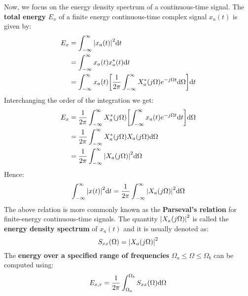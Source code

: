\documentclass[../../main/main.tex]{subfiles}
\begin{document}
\medskip
{}
Now, we focus on the energy density spectrum of a continuous-time signal. The \textbf{total energy} \( E_{x} \) of a finite energy continuous-time complex signal \( x_{a}(t) \) is given by:
\begin{align}
    E_{x}
    &=
        \int_{-\infty}^{\infty} \abs{x_{a}(t)}^2 \mathrm{d}{t}  \nonumber   \\
    &=
        \int_{-\infty}^{\infty} x_{a}(t) x^*_{a}(t) \mathrm{d}{t}   \nonumber   \\
    &=
        \int_{-\infty}^{\infty} x_{a}(t) \qty[\frac{1}{2\pi} \int_{-\infty}^{\infty} X_{a}^{*}(j\Omega) e^{-j\Omega t} \mathrm{d}{\Omega}] \mathrm{d}{t}
\end{align}
Interchanging the order of the integration we get:
\begin{align}
    E_{x}
    &=
        \frac{1}{2\pi} \int_{-\infty}^{\infty} X_{a}^{*}(j\Omega) \qty[\int_{-\infty}^{\infty} x_{a}(t) e^{-j\Omega t} \mathrm{d}{t}] \mathrm{d}{\Omega}    \nonumber   \\
    &=
        \frac{1}{2\pi} \int_{-\infty}^{\infty} X_{a}^{*}(j\Omega) X_{a}(j\Omega) \mathrm{d}{\Omega} \nonumber   \\
    &=
        \frac{1}{2\pi} \int_{-\infty}^{\infty} \abs{X_{a}(j\Omega)}^2 \mathrm{d}{\Omega}
\end{align}
Hence:
\begin{equation}
    \int_{-\infty}^{\infty} \abs{x(t)}^2 \mathrm{d}{t}
    =
    \frac{1}{2\pi} \int_{-\infty}^{\infty} \abs{X_{a}(j\Omega)}^2 \mathrm{d}{\Omega}
    \label{eq:L08_S11_1}
\end{equation}
The above relation is more commonly known as the \textbf{Parseval's relation} for finite-energy continuous-time signals.
The quantity \( \abs{X_{a}(j\Omega)}^2 \) is called the \textbf{energy density spectrum} of \( x_{a}(t) \) and it is usually denoted as:
\begin{equation}
    S_{xx}(\Omega)
    =
    \abs{X_{a}(j\Omega)}^{2}
    \label{eq:L08_S12_1}
\end{equation}
The \textbf{energy over a specified range of frequencies} \( \Omega_a \le \Omega \le \Omega_{b} \) can be computed using:
\begin{equation}
    E_{x,r}
    =
    \frac{1}{2\pi} \int_{\Omega_a}^{\Omega_b} S_{xx}(\Omega) \mathrm{d}{\Omega}
    \label{eq:L08_S12_2}
\end{equation}
\end{document}
